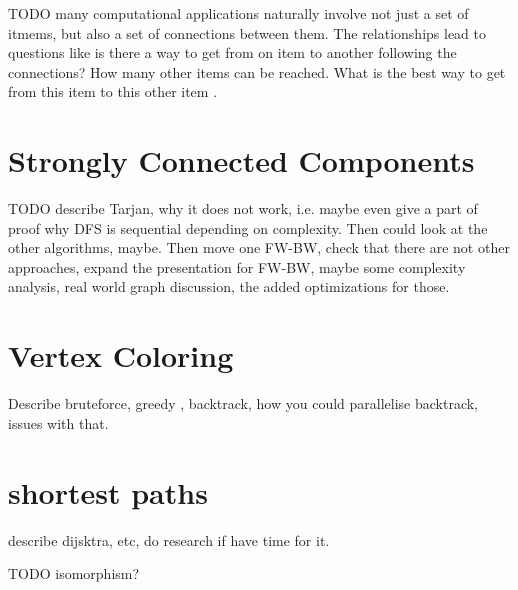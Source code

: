 \documentclass{report}
\theoremstyle{plain}
\theoremstyle{definition}
\theoremstyle{remark}
\numberwithin{definition}{chapter}
\numberwithin{example}{chapter}
\numberwithin{figure}{chapter}
\begin{document}
TODO many computational applications naturally involve not just a set of itmems, but also a set of connections between them. The relationships lead to questions like is there a way to get from on item to another following the connections? How many other items can be reached. What is the best way to get from this item to this other item \cite{c++_sedgewick}. 

\chapter{Strongly Connected Components}

TODO describe Tarjan, why it does not work, i.e. maybe even give a part of proof why DFS is sequential depending on complexity. Then could look at the other algorithms, maybe. Then move one FW-BW, check that there are not other approaches, expand the presentation for FW-BW, maybe some complexity analysis, real world graph discussion, the added optimizations for those.

\chapter{Vertex Coloring}

Describe bruteforce, greedy , backtrack, how you could parallelise backtrack, issues with that.

\chapter{shortest paths}

describe dijsktra, etc, do research if have time for it.


TODO isomorphism?



\end{document}
